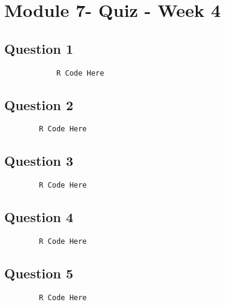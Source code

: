 \documentclass[french]{article}
\begin{document}
	
	\section*{Module 7- Quiz - Week 4}
	\subsection*{Question 1}
		\begin{framed}
			\begin{verbatim}
			R Code Here
			\end{verbatim}
		\end{framed}
	\newpage
	\subsection*{Question 2}
	
	\begin{framed}
		\begin{verbatim}
		R Code Here
		\end{verbatim}
	\end{framed}
	\newpage
	\subsection*{Question 3}
	\begin{framed}
		\begin{verbatim}
		R Code Here
		\end{verbatim}
	\end{framed}
	\newpage
	\subsection*{Question 4}
	\begin{framed}
		\begin{verbatim}
		R Code Here
		\end{verbatim}
	\end{framed}
	\newpage
	\subsection*{Question 5}
	\begin{framed}
		\begin{verbatim}
		R Code Here
		\end{verbatim}
	\end{framed}
\end{document}
